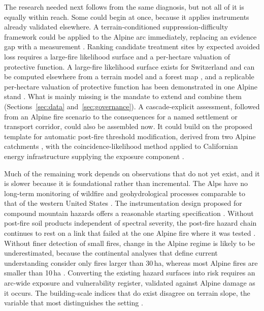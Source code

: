 \documentclass[11pt,a4paper]{article}
\begin{document}
The research needed next follows from the same diagnosis, but not all of it is equally within reach. Some could begin at once, because it applies instruments already validated elsewhere. A terrain-conditioned suppression-difficulty framework could be applied to the Alpine arc immediately, replacing an evidence gap with a measurement \citep{cardil_assessing_2025}. Ranking candidate treatment sites by expected avoided loss requires a large-fire likelihood surface and a per-hectare valuation of protective function. A large-fire likelihood surface exists for Switzerland and can be computed elsewhere from a terrain model and a forest map \citep{conedera_linking_2024}, and a replicable per-hectare valuation of protective function has been demonstrated in one Alpine stand \citep{accastello_asforesee_2019}. What is mainly missing is the mandate to extend and combine them (Sections~\ref{sec:data} and~\ref{sec:governance}). A cascade-explicit assessment, followed from an Alpine fire scenario to the consequences for a named settlement or transport corridor, could also be assembled now. It could build on the proposed template for automatic post-fire threshold modification, derived from two Alpine catchments \citep{tiranti_wildfires_2021}, with the coincidence-likelihood method applied to Californian energy infrastructure supplying the exposure component \citep{moftakhari_increasing_2019}.

Much of the remaining work depends on observations that do not yet exist, and it is slower because it is foundational rather than incremental. The Alps have no long-term monitoring of wildfire and geohydrological processes comparable to that of the western United States \citep{melzner_wildfire-induced_2025}. The instrumentation design proposed for compound mountain hazards offers a reasonable starting specification \citep{baselt_compound_2026}. Without post-fire soil products independent of spectral severity, the post-fire hazard chain continues to rest on a link that failed at the one Alpine fire where it was tested \citep{negri_wildfire_2026}. Without finer detection of small fires, change in the Alpine regime is likely to be underestimated, because the continental analyses that define current understanding consider only fires larger than 30\,ha, whereas most Alpine fires are smaller than 10\,ha \citep{beloiu_climatedriven_2026}. Converting the existing hazard surfaces into risk requires an arc-wide exposure and vulnerability register, validated against Alpine damage as it occurs. The building-scale indices that do exist disagree on terrain slope, the variable that most distinguishes the setting \citep{papathomakohle_towards_2025, papathomakohle_wildfire_2022}.
\end{document}
